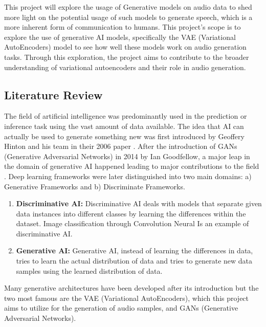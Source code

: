 \documentclass[12pt]{article}
\begin{document}
This project will explore the usage of Generative models on audio data to shed more light on the potential usage of such models to generate speech, which is a more inherent form of communication to humans. This project's scope is to explore the use of generative AI models, specifically the VAE (Variational AutoEncoders) model to see how well these models work on audio generation tasks. Through this exploration, the project aims to contribute to the broader understanding of variational autoencoders and their role in audio generation.


\subsection{Literature Review}
The field of artificial intelligence was predominantly used in the prediction or inference task using the vast amount of data available. The idea that AI can actually be used to generate something new was first introduced by Geoffery Hinton and his team in their 2006 paper \cite{Hinton2006Fast}. After the introduction of GANs (Generative Adversarial Networks) in 2014 by Ian Goodfellow, a major leap in the domain of generative AI happened leading to major contributions to the field \cite{Goodfellow2014Generative}. Deep learning frameworks were later distinguished into two main domains: a) Generative Frameworks and b) Discriminate Frameworks.
\begin{enumerate}
    \item \textbf{Discriminative AI: }Discriminative AI deals with models that separate given data instances into different classes by learning the differences within the dataset. Image classification through Convolution Neural Is an example of discriminative AI.
    \item \textbf{Generative AI: }Generative AI, instead of learning the differences in data, tries to learn the actual distribution of data and tries to generate new data samples using the learned distribution of data. 
\end{enumerate}

Many generative architectures have been developed after its introduction but the two most famous are the VAE (Variational AutoEncoders), which this project aims to utilize for the generation of audio samples,  and GANs (Generative Adversarial Networks).
\end{document}
